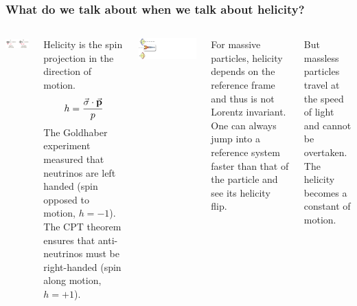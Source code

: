 \begin{frame}
\frametitle{What do we talk about when we talk about helicity?}
\begin{columns}
\includegraphics[scale=0.35]{img/NeutrinoHelicity.png}

Helicity is the spin projection in the direction of motion.
\[
h = \frac{\va{\sigma}\cdot \va{p}}{p}
\]
The Goldhaber experiment measured that neutrinos are left handed (spin opposed to motion, $h=-1$). The CPT theorem ensures that anti-neutrinos must be right-handed (spin along motion, $h=+1$).

\includegraphics[scale=0.30]{img/neutrinoBoost2.png}

For massive particles, helicity depends on the reference frame and thus is not Lorentz invariant. One can always jump into a reference system faster than that of the particle and see its helicity flip.

But massless particles travel at the speed of light and cannot be overtaken. The helicity becomes a constant of motion. 
\end{columns}

\end{frame}

%
%



